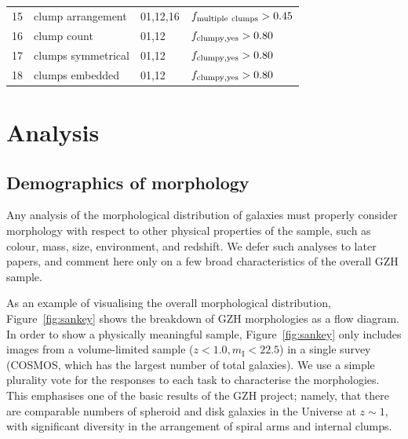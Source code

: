 \documentclass[a4paper,fleqn,usenatbib]{mnras}
\begin{document}
\begin{table}
\begin{tabular}{llll}
15       & clump arrangement    & 01,12,16         & $f_{\rm multiple~clumps}>0.45$     \\
16       & clump count          & 01,12            & $f_{\rm clumpy,yes}>0.80$          \\
17       & clumps symmetrical   & 01,12            & $f_{\rm clumpy,yes}>0.80$          \\
18       & clumps embedded      & 01,12            & $f_{\rm clumpy,yes}>0.80$          \\
\hline\hline
\end{tabular}
\end{table}

\section{Analysis}\label{sec:analysis}


\subsection{Demographics of morphology}

Any analysis of the morphological distribution of galaxies must properly
consider morphology with respect to other physical properties of the sample,
such as colour, mass, size, environment, and redshift. We defer such analyses to
later papers, and comment here only on a few broad characteristics of the
overall GZH sample. 

As an example of visualising the overall morphological distribution,
Figure~\ref{fig:sankey} shows the breakdown of GZH morphologies as a flow
diagram. In order to show a physically meaningful sample,
Figure~\ref{fig:sankey} only includes images from a volume-limited sample
($z<1.0, m_\mathrm{I}<22.5$) in a single \hst{} survey (COSMOS, which has the
largest number of total galaxies).  We use a simple plurality vote for the
responses to each task to characterise the morphologies.  This emphasises one
of the basic results of the GZH project; namely, that there are comparable
numbers of spheroid and disk galaxies in the Universe at $z\sim1$, with
significant diversity in the arrangement of spiral arms and internal clumps.
\end{document}
